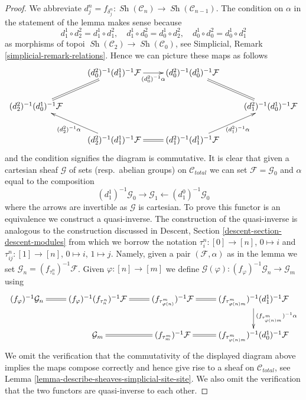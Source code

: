 \documentclass{stacks-project}
\theoremstyle{plain}
\theoremstyle{definition}
\theoremstyle{remark}
\numberwithin{equation}{subsection}
\def\Sh{\mathop{\mathit{Sh}}\nolimits}
\begin{document}
\begin{proof}
We abbreviate
$d^n_j = f_{\delta^n_j} : \Sh(\mathcal{C}_n) \to \Sh(\mathcal{C}_{n - 1})$.
The condition on $\alpha$ in the statement of the lemma makes sense because
$$
d^1_1 \circ d^2_2 = d^1_1 \circ d^2_1, \quad
d^1_1 \circ d^2_0 = d^1_0 \circ d^2_2, \quad
d^1_0 \circ d^2_0 = d^1_0 \circ d^2_1
$$
as morphisms of topoi $\Sh(\mathcal{C}_2) \to \Sh(\mathcal{C}_0)$, see
Simplicial, Remark \ref{simplicial-remark-relations}. Hence we
can picture these maps as follows
$$
\xymatrix{
& (d^2_0)^{-1}(d^1_1)^{-1}\mathcal{F} \ar[r]_-{(d^2_0)^{-1}\alpha} &
(d^2_0)^{-1}(d^1_0)^{-1}\mathcal{F} \ar@{=}[rd] & \\
(d^2_2)^{-1}(d^1_0)^{-1}\mathcal{F} \ar@{=}[ru] & & &
(d^2_1)^{-1}(d^1_0)^{-1}\mathcal{F} \\
& (d^2_2)^{-1}(d^1_1)^{-1}\mathcal{F} \ar[lu]^{(d^2_2)^{-1}\alpha} \ar@{=}[r] &
(d^2_1)^{-1}(d^1_1)^{-1}\mathcal{F} \ar[ru]_{(d^2_1)^{-1}\alpha}
}
$$
and the condition signifies the diagram is commutative. It is clear that
given a cartesian sheaf $\mathcal{G}$ of sets (resp.\ abelian groups)
on $\mathcal{C}_{total}$
we can set $\mathcal{F} = \mathcal{G}_0$ and $\alpha$ equal to the composition
$$
(d_1^1)^{-1}\mathcal{G}_0 \to \mathcal{G}_1
\leftarrow (d_1^0)^{-1}\mathcal{G}_0
$$
where the arrows are invertible as $\mathcal{G}$ is cartesian.
To prove this functor
is an equivalence we construct a quasi-inverse. The construction of
the quasi-inverse is analogous to the construction discussed in
Descent, Section \ref{descent-section-descent-modules} from which we borrow
the notation $\tau^n_i : [0] \to [n]$, $0 \mapsto i$ and
$\tau^n_{ij} : [1] \to [n]$, $0 \mapsto i$, $1 \mapsto j$.
Namely, given a pair $(\mathcal{F}, \alpha)$
as in the lemma we set $\mathcal{G}_n = (f_{\tau^n_n})^{-1}\mathcal{F}$.
Given $\varphi : [n] \to [m]$ we define
$\mathcal{G}(\varphi) : (f_\varphi)^{-1}\mathcal{G}_n \to \mathcal{G}_m$
using
$$
\xymatrix{
(f_\varphi)^{-1}\mathcal{G}_n \ar@{=}[r] &
(f_\varphi)^{-1}(f_{\tau^n_n})^{-1}\mathcal{F} \ar@{=}[r] &
(f_{\tau^m_{\varphi(n)}})^{-1}\mathcal{F} \ar@{=}[r] &
(f_{\tau^m_{\varphi(n)m}})^{-1}(d^1_1)^{-1}\mathcal{F}
\ar[d]^{(f_{\tau^m_{\varphi(n)m}})^{-1}\alpha} \\
&
\mathcal{G}_m \ar@{=}[r] &
(f_{\tau^m_m})^{-1}\mathcal{F} \ar@{=}[r] &
(f_{\tau^m_{\varphi(n)m}})^{-1}(d^1_0)^{-1}\mathcal{F}
}
$$
We omit the verification that the commutativity of the displayed diagram
above implies the maps compose correctly and hence give rise to a
sheaf on $\mathcal{C}_{total}$, see
Lemma \ref{lemma-describe-sheaves-simplicial-site-site}.
We also omit the verification
that the two functors are quasi-inverse to each other.
\end{proof}
\end{document}
